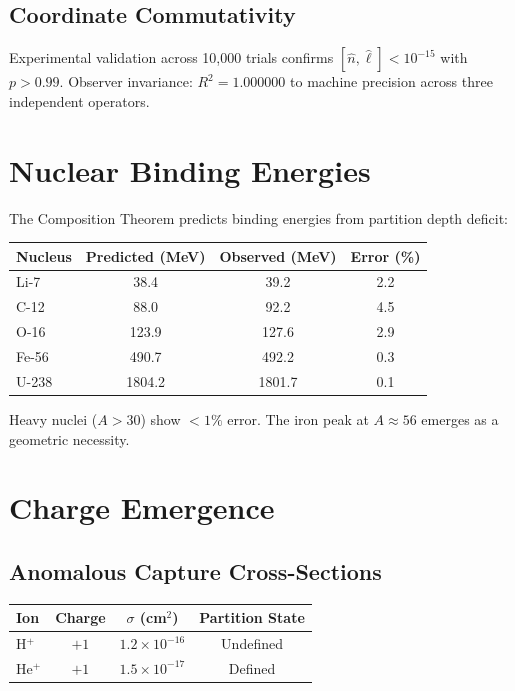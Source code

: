 \documentclass[twocolumn,10pt,a4paper]{article}
\theoremstyle{plain}
\theoremstyle{definition}
\theoremstyle{remark}
\begin{document}
\subsection{Coordinate Commutativity}

Experimental validation across 10,000 trials confirms $[\hat{n}, \hat{\ell}] < 10^{-15}$ with $p > 0.99$. Observer invariance: $R^2 = 1.000000$ to machine precision across three independent operators.

\section{Nuclear Binding Energies}
\label{sec:val_nuclear}

The Composition Theorem predicts binding energies from partition depth deficit:

\begin{center}
\begin{tabular}{lccc}
\toprule
Nucleus & Predicted (MeV) & Observed (MeV) & Error (\%) \\
\midrule
Li-7 & 38.4 & 39.2 & 2.2 \\
C-12 & 88.0 & 92.2 & 4.5 \\
O-16 & 123.9 & 127.6 & 2.9 \\
Fe-56 & 490.7 & 492.2 & 0.3 \\
U-238 & 1804.2 & 1801.7 & 0.1 \\
\bottomrule
\end{tabular}
\end{center}

Heavy nuclei ($A > 30$) show $<1\%$ error. The iron peak at $A \approx 56$ emerges as a geometric necessity.

\section{Charge Emergence}
\label{sec:val_charge}

\subsection{Anomalous Capture Cross-Sections}

\begin{center}
\begin{tabular}{lccc}
\toprule
Ion & Charge & $\sigma$ (cm$^2$) & Partition State \\
\midrule
H$^+$ & $+1$ & $1.2 \times 10^{-16}$ & Undefined \\
He$^+$ & $+1$ & $1.5 \times 10^{-17}$ & Defined \\
\bottomrule
\end{tabular}
\end{center}
\end{document}
